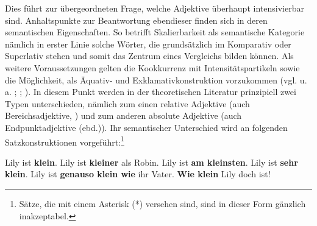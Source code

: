 Dies führt zur übergeordneten Frage, welche Adjektive überhaupt intensivierbar sind. Anhaltspunkte zur Beantwortung ebendieser finden sich in deren semantischen Eigenschaften. So betrifft Skalierbarkeit als semantische Kategorie nämlich in erster Linie solche Wörter, die grundsätzlich im Komparativ oder Superlativ stehen und somit das Zentrum eines Vergleichs bilden können. Als weitere Voraussetzungen gelten die Kookkurrenz mit Intensitätspartikeln sowie die Möglichkeit, als Äquativ- und Exklamativkonstruktion vorzukommen (vgl. u.\,a. {\citealt[424]{Gnutzmann.1975}}; {\citealt[31]{Lutzeier.1981}}; {\citealt[130]{Bierwisch.1987b}}). In diesem Punkt werden in der theoretischen Literatur prinzipiell zwei Typen unterschieden, nämlich zum einen relative Adjektive (auch \glqq{}Bereichsadjektive\grqq{}, {\citealt[410]{Breindl.2007}})
und zum anderen absolute Adjektive (auch \glqq{}Endpunktadjektive\grqq{} (ebd.)). Ihr semantischer Unterschied wird an folgenden Satzkonstruktionen vorgeführt:\footnote{Sätze, die mit einem Asterisk (*) versehen sind, sind in dieser Form gänzlich inakzeptabel.}

\ea   \label{rel}
\ea Lily ist \textbf{klein}. \label{rel1}
\ex Lily ist \textbf{kleiner} als Robin. \label{rel2}
\ex Lily ist \textbf{am kleinsten}. \label{rel3}
\ex Lily ist \textbf{sehr klein}. \label{rel4}
\ex Lily ist \textbf{genauso klein wie} ihr Vater. \label{rel5}
\ex \textbf{Wie klein} Lily doch ist! \label{rel6}
\z
\z

\ea  \label{abs}
 \z
 \z

